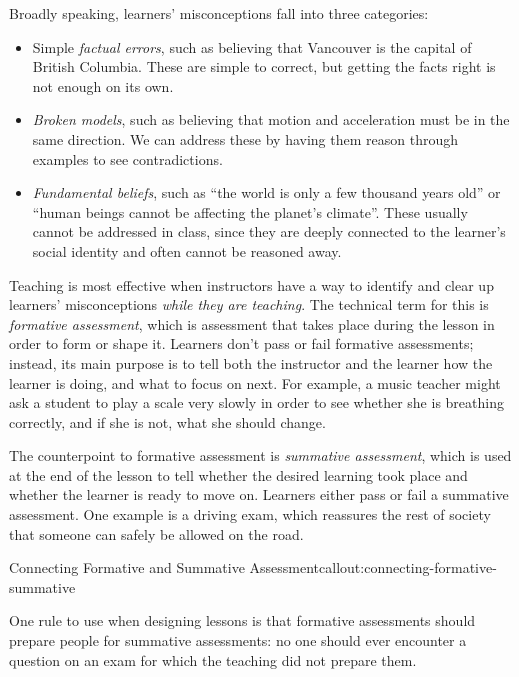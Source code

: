 Broadly speaking, learners' misconceptions fall into three categories:

\begin{itemize}

\item
  Simple \emph{factual errors}, such as believing that Vancouver is
  the capital of British Columbia. These are simple to correct, but
  getting the facts right is not enough on its own.

\item
  \emph{Broken models}, such as believing that motion and acceleration
  must be in the same direction. We can address these by having them
  reason through examples to see contradictions.

\item
  \emph{Fundamental beliefs}, such as ``the world is only a few
  thousand years old'' or ``human beings cannot be affecting the
  planet's climate''. These usually cannot be addressed in class,
  since they are deeply connected to the learner's social identity and
  often cannot be reasoned away.

\end{itemize}

Teaching is most effective when instructors have a way to identify and
clear up learners' misconceptions \emph{while they are teaching}.  The
technical term for this is \emph{formative assessment}, which is
assessment that takes place during the lesson in order to form or
shape it.  Learners don't pass or fail formative assessments; instead,
its main purpose is to tell both the instructor and the learner how
the learner is doing, and what to focus on next.  For example, a music
teacher might ask a student to play a scale very slowly in order to
see whether she is breathing correctly, and if she is not, what she
should change.

The counterpoint to formative assessment is \emph{summative
assessment}, which is used at the end of the lesson to tell whether
the desired learning took place and whether the learner is ready to
move on.  Learners either pass or fail a summative assessment. One
example is a driving exam, which reassures the rest of society that
someone can safely be allowed on the road.

\begin{callout}{Connecting Formative and Summative Assessment}{callout:connecting-formative-summative}

One rule to use when designing lessons is that formative assessments
should prepare people for summative assessments: no one should ever
encounter a question on an exam for which the teaching did not prepare
them.

\end{callout}

